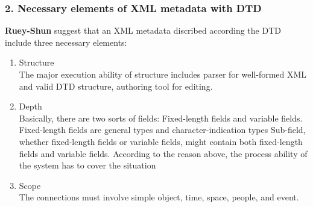 \documentclass[a4paper]{article}
\begin{document}
\subsubsection*{2. Necessary elements of XML metadata with DTD}
\label{sec:mets}
{\bf Ruey-Shun}\cite{chen2003developing} suggest that an XML metadata discribed according the DTD include three necessary elements:
\begin{enumerate}
	\item Structure\\
	The major execution ability of structure includes parser for well-formed XML and
	valid DTD structure, authoring tool for editing.
	
	\item Depth\\
	Basically, there are two sorts of fields: Fixed-length fields and variable fields.
	Fixed-length fields are general types and character-indication types Sub-field, whether
	fixed-length fields or variable fields, might contain both fixed-length fields and
	variable fields. According to the reason above, the process ability of the system has to
	cover the situation
	
	\item Scope\\
	The connections must involve simple object, time, space, people, and event. 
\end{enumerate}



	
	\clearpage 


\clearpage %
\end{document}
